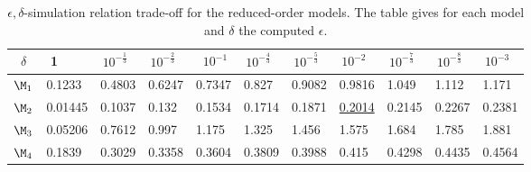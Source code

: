 \documentclass[letterpaper, 10 pt, conference]{amsart}
\theoremstyle{definition}
\theoremstyle{example}
\theoremstyle{remark}
\newcommand{\eps}{\epsilon}
\begin{document}
\begin{table}[htp]
\caption{$\eps,\delta$-simulation relation trade-off for the reduced-order models. The table gives for each model and $\delta$ the computed $\eps$. }
\label{apprxsimulation}
\begin{tabular}{c|llllllllll}
 $\delta$& \,\,1 &\,$10^{-\frac{1}{3}}$&\,$10^{-\frac{2}{3}} $& \,  $ 10^{-1}$&\,$10^{-\frac{4}{3}}\!$ &\,$10^{-\frac{5}{3}}$ &\,$ 10^{-2}$&\,$10^{-\frac{7}{3}}$&\,$10^{-\frac{8}{3}} $&\,$10^{- {3}}$\\ \hline
\!\!$\M_1$\!\!& \small 0.1233 \!\!\!\!& \small 0.4803 \!\!\!\!& \small 0.6247 \!\!\!\!& \small 0.7347 \!\!\!\!& \small  0.827 \!\!\!\!& \small 0.9082 \!\!\!\!& \small 0.9816 \!\!\!\!& \small  1.049 \!\!\!\!& \small  1.112 \!\!\!\!& \small  1.171 \\ 
\!\!$\M_2$\!\!& \small 0.01445 \!\!\!\!& \small 0.1037 \!\!\!\!& \small  0.132 \!\!\!\!& \small 0.1534 \!\!\!\!& \small 0.1714 \!\!\!\!& \small 0.1871 \!\!\!\!& {\small{\underline{0.2014}}}\!\!\!\!& \small 0.2145 \!\!\!\!& \small 0.2267 \!\!\!\!& \small 0.2381 \\ 
\!\!$\M_3$\!\!& \small0.05206 \!\!\!\!& \small 0.7612 \!\!\!\!& \small  0.997 \!\!\!\!& \small  1.175 \!\!\!\!& \small  1.325 \!\!\!\!& \small  1.456 \!\!\!\!& \small  1.575 \!\!\!\!& \small  1.684 \!\!\!\!& \small  1.785 \!\!\!\!& \small  1.881 \\ 
\!\!$\M_4$\!\!& \small  0.1839 \!\!\!\!& \small 0.3029 \!\!\!\!& \small 0.3358 \!\!\!\!& \small 0.3604 \!\!\!\!& \small 0.3809 \!\!\!\!& \small 0.3988 \!\!\!\!& \small  0.415 \!\!\!\!& \small 0.4298 \!\!\!\!& \small 0.4435 \!\!\!\!& \small 0.4564  \end{tabular}\end{table}
\end{document}
